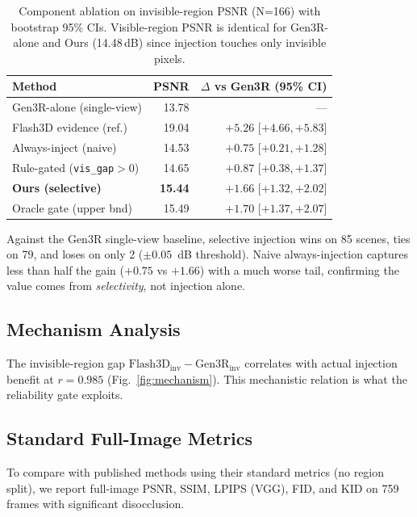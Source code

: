 \documentclass[10pt,twocolumn,letterpaper]{article}
\begin{document}
\begin{table}[t]
\centering
\small
\caption{Component ablation on invisible-region PSNR (N=166) with bootstrap 95\%
CIs. Visible-region PSNR is identical for Gen3R-alone and Ours (14.48\,dB) since
injection touches only invisible pixels.}
\begin{tabular}{lrr}
\toprule
Method & PSNR & $\Delta$ vs Gen3R (95\% CI) \\
\midrule
Gen3R-alone (single-view) & 13.78 & --- \\
Flash3D evidence (ref.) & 19.04 & $+5.26$ [$+4.66,+5.83$] \\
Always-inject (naive) & 14.53 & $+0.75$ [$+0.21,+1.28$] \\
Rule-gated (\texttt{vis\_gap}$>$0) & 14.65 & $+0.87$ [$+0.38,+1.37$] \\
\textbf{Ours (selective)} & \textbf{15.44} & $\mathbf{+1.66}$ [$+1.32,+2.02$] \\
Oracle gate (upper bnd) & 15.49 & $+1.70$ [$+1.37,+2.07$] \\
\bottomrule
\end{tabular}
\end{table}

Against the Gen3R single-view baseline, selective injection wins on 85 scenes,
ties on 79, and loses on only 2 ($\pm0.05$~dB threshold). Naive always-injection
captures less than half the gain ($+0.75$ vs $+1.66$) with a much worse tail,
confirming the value comes from \emph{selectivity}, not injection alone.

\subsection{Mechanism Analysis}
\label{sec:mechanism}
The invisible-region gap $\text{Flash3D}_{\text{inv}}-\text{Gen3R}_{\text{inv}}$
correlates with actual injection benefit at $r=0.985$ (Fig.~\ref{fig:mechanism}).
This mechanistic relation is what the reliability gate exploits.

\subsection{Standard Full-Image Metrics}
\label{sec:stdmetrics}
To compare with published methods using their standard metrics (no region
split), we report full-image PSNR, SSIM, LPIPS (VGG), FID, and KID on 759
frames with significant disocclusion.
\end{document}
